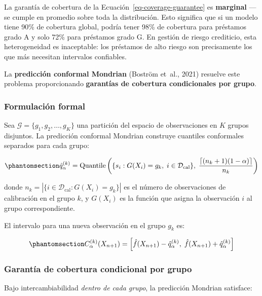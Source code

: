 \documentclass[
  spanish,
  11pt,
  letterpaper,
]{scrbook}
\theoremstyle{plain}
\theoremstyle{remark}
\begin{document}
La garantía de cobertura de la Ecuación~\ref{eq-coverage-guarantee} es
\textbf{marginal} --- se cumple en promedio sobre toda la distribución.
Esto significa que si un modelo tiene 90\% de cobertura global, podría
tener 98\% de cobertura para préstamos grado A y solo 72\% para
préstamos grado G. En gestión de riesgo crediticio, esta heterogeneidad
es inaceptable: los préstamos de alto riesgo son precisamente los que
más necesitan intervalos confiables.

La \textbf{predicción conformal Mondrian} ({Boström et~al.}, 2021)
resuelve este problema proporcionando \textbf{garantías de cobertura
condicionales por grupo}.

\subsubsection{Formulación formal}\label{sec-mondrian-formal}

Sea \(\mathcal{G} = \{g_1, g_2, \ldots, g_K\}\) una partición del
espacio de observaciones en \(K\) grupos disjuntos. La predicción
conformal Mondrian construye cuantiles conformales separados para cada
grupo:

\begin{equation}\protect\phantomsection\label{eq-mondrian-quantile-primer}{
\hat{q}_\alpha^{(k)} = \text{Quantile}\left(\{s_i : G(X_i) = g_k, \; i \in \mathcal{D}_\text{cal}\}, \; \frac{\lceil (n_k + 1)(1-\alpha) \rceil}{n_k}\right)
}\end{equation}

donde \(n_k = |\{i \in \mathcal{D}_\text{cal} : G(X_i) = g_k\}|\) es el
número de observaciones de calibración en el grupo \(k\), y \(G(X_i)\)
es la función que asigna la observación \(i\) al grupo correspondiente.

El intervalo para una nueva observación en el grupo \(g_k\) es:

\begin{equation}\protect\phantomsection\label{eq-mondrian-interval}{
C_\alpha^{(k)}(X_{n+1}) = \left[\hat{f}(X_{n+1}) - \hat{q}_\alpha^{(k)}, \; \hat{f}(X_{n+1}) + \hat{q}_\alpha^{(k)}\right]
}\end{equation}

\subsubsection{Garantía de cobertura condicional por
grupo}\label{sec-mondrian-guarantee}

Bajo intercambiabilidad \emph{dentro de cada grupo}, la predicción
Mondrian satisface:
\end{document}
